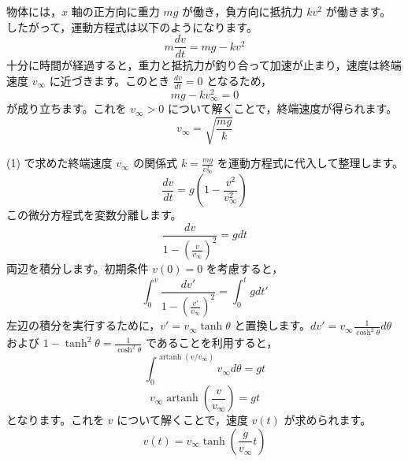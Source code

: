 \solutionheading
\begin{solutionparts}

物体には，$x$ 軸の正方向に重力 $mg$ が働き，負方向に抵抗力 $kv^2$ が働きます。 したがって，運動方程式は以下のようになります。
\begin{equation*}
m \frac{dv}{dt} = mg - kv^2
\end{equation*}
十分に時間が経過すると，重力と抵抗力が釣り合って加速が止まり，速度は終端速度 $v_{\infty}$ に近づきます。このとき $\frac{dv}{dt} = 0$ となるため，
\begin{equation*}
mg - k v_{\infty}^2 = 0
\end{equation*}
が成り立ちます。これを $v_{\infty} > 0$ について解くことで，終端速度が得られます。
\begin{equation*}
v_{\infty} = \sqrt{\frac{mg}{k}}
\end{equation*}

(1) で求めた終端速度 $v_{\infty}$ の関係式 $k = \frac{mg}{v_{\infty}^2}$ を運動方程式に代入して整理します。
\begin{equation*}
\frac{dv}{dt} = g \left( 1 - \frac{v^2}{v_{\infty}^2} \right)
\end{equation*}
この微分方程式を変数分離します。
\begin{equation*}
\frac{dv}{1 - \left(\frac{v}{v_{\infty}}\right)^2} = g dt
\end{equation*}
両辺を積分します。初期条件 $v(0) = 0$ を考慮すると，
\begin{equation*}
\int_{0}^{v} \frac{dv'}{1 - \left(\frac{v'}{v_{\infty}}\right)^2} = \int_{0}^{t} g dt'
\end{equation*}
左辺の積分を実行するために，$v' = v_{\infty} \tanh \theta$ と置換します。$dv' = v_{\infty} \frac{1}{\cosh^2 \theta} d\theta$ および $1 - \tanh^2 \theta = \frac{1}{\cosh^2 \theta}$ であることを利用すると，
\begin{equation*}
\int_{0}^{\operatorname{artanh}(v/v_{\infty})} v_{\infty} d\theta = gt
\end{equation*}
\begin{equation*}
v_{\infty} \operatorname{artanh} \left( \frac{v}{v_{\infty}} \right) = gt
\end{equation*}
となります。これを $v$ について解くことで，速度 $v(t)$ が求められます。
\begin{equation*}
v(t) = v_{\infty} \tanh \left( \frac{g}{v_{\infty}} t \right)
\end{equation*}


\end{solutionparts}
